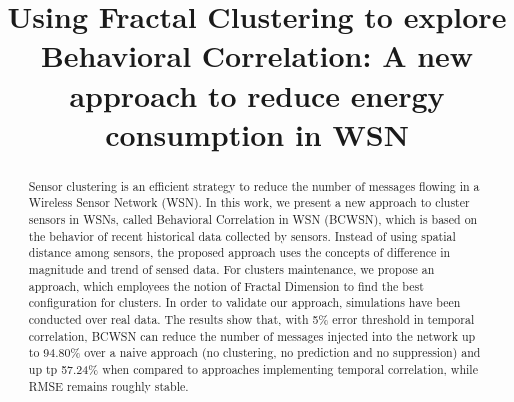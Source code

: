 \documentclass{acm_proc_article-sp}
\begin{document}
%

\title{Using Fractal Clustering to explore Behavioral Correlation: A new
approach to reduce energy consumption in WSN}



\maketitle


\begin{abstract}

Sensor clustering is an efficient strategy to reduce the number of messages
flowing in a Wireless Sensor Network (WSN).
In this work, we present a new approach to cluster sensors in WSNs, called
Behavioral Correlation in WSN (BCWSN), which is based on the behavior of recent
historical data collected by sensors. Instead of using spatial distance
among sensors, the proposed approach uses the concepts
of difference in magnitude and trend of sensed data. For clusters maintenance,
we propose an approach, which
employees the notion of Fractal Dimension to find the best configuration
for clusters. In order to validate our approach, simulations have been
conducted over real data. The results show that, with 5\% error threshold in
temporal correlation, BCWSN can reduce the number of messages injected into the network up to 94.80\% over a naive approach (no clustering, no prediction and no suppression) and 
up tp 57.24\% when compared to approaches implementing temporal correlation, while RMSE remains roughly 
stable.


\end{abstract}


\end{document}
